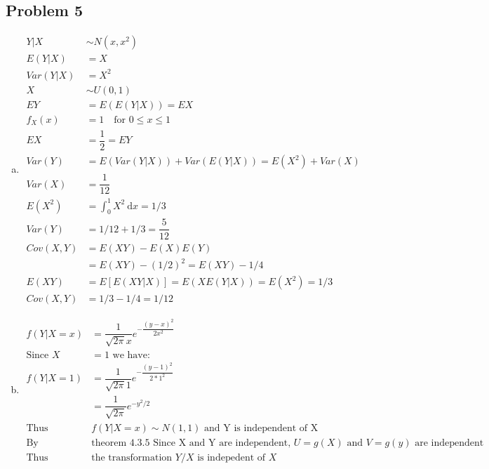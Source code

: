 \documentclass{article}
\newcommand{\dx}{\mathrm{d}x}
\begin{document}
\begin{flushleft}
\section*{Problem 5}
\begin{enumerate}[(a)]
\item 
\begin{align*}
Y|X & \sim N(x,x^2)\\
E(Y|X)&=X\\
Var(Y|X)&=X^2\\
X&\sim U(0,1)\\
EY &= E(E(Y|X))=EX\\
f_X(x)&=1 \quad \text{for } 0\leq x \leq 1\\
EX&=\dfrac{1}{2}=EY\\
Var(Y)&=E(Var(Y|X))+Var(E(Y|X))=E(X^2)+Var(X)\\
Var(X)&=\dfrac{1}{12}\\
E(X^2)&=\int_{0}^{1}X^2 \ \dx=1/3\\
Var(Y)&=1/12+1/3=\dfrac{5}{12}\\
Cov(X,Y)&=E(XY)-E(X)E(Y)\\
&=E(XY)-(1/2)^2=E(XY)-1/4\\
E(XY)&=E[E(XY|X)]=E(XE(Y|X))=E(X^2)=1/3\\
Cov(X,Y)&=1/3-1/4=1/12
\end{align*}
\item
\begin{align*}
f(Y|X=x)&=\dfrac{1}{\sqrt{2\pi}x}e^{-\dfrac{(y-x)^2}{2x^2}}\\
\text{Since } X&=1 \text{ we have:}\\
f(Y|X=1)&=\dfrac{1}{\sqrt{2\pi}1}e^{-\dfrac{(y-1)^2}{2*1^2}}\\
&=\dfrac{1}{\sqrt{2\pi}}e^{-y^2/2}\\
\text{Thus }& f(Y|X=x) \sim N(1,1) \text{ and Y is independent of X}\\
\text{By }&\text{theorem 4.3.5 Since X and Y are independent, } U=g(X) \text{ and } V=g(y) \text{ are independent}\\
\text{Thus }&\text{the transformation } Y/X \text{ is indepedent of } X
\end{align*}
\end{enumerate}

\end{flushleft}
\end{document}
